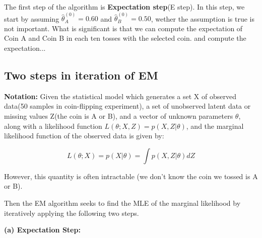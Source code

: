 \documentclass[11pt]{scrartcl} %
\begin{document}
\medskip

The first step of the algorithm is \textbf{Expectation step}(E step). In this step, we start by assuming $\hat{\theta}_A^{(0)} = 0.60$ and $\hat{\theta}_B^{(0)} = 0.50$, wether the assumption is true is not important. What is significant is that we can compute the expectation of Coin A and Coin B in each ten tosses with the selected coin. and compute the expectation...

\medskip

\subsection{Two steps in iteration of EM}
\textbf{Notation:} Given the statistical model which generates a set X of observed data(50 samples in coin-flipping experiment), a set of unobserved latent data or missing values Z(the coin is A or B), and a vector of unknown parameters $\theta$, along with a likelihood function $L(\theta; X, Z) = p(X, Z| \theta)$,  and the marginal likelihood function of the observed data is given by:

$$L(\theta; X) = p(X| \theta) = \int p(X, Z| \theta)dZ$$

However, this quantity is often intractable (we don't know the coin we tossed is A or B). 

\medskip

Then the EM algorithm seeks to find the MLE of the marginal likelihood by iteratively applying the following two steps.

\textbf{(a) Expectation Step:} 

\end{document}
